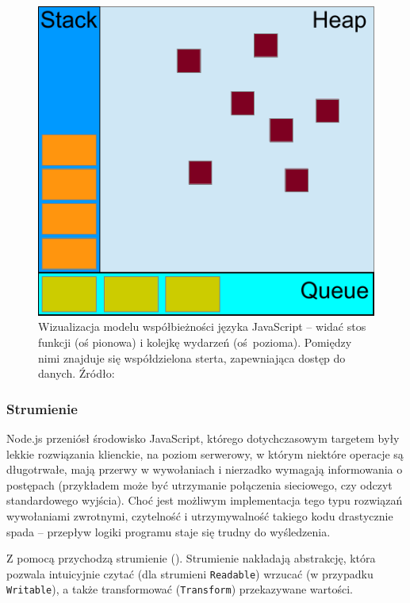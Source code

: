 \begin{figure}[h]

    \centering
    \includegraphics[scale=0.6]{js-concurrency.pdf}

	\caption{Wizualizacja modelu współbieżności języka JavaScript -- widać stos funkcji (oś pionowa) i kolejkę wydarzeń (oś pozioma). Pomiędzy nimi znajduje się współdzielona sterta, zapewniająca dostęp do danych. Źródło: \cite{eventLoop}}

\end{figure}

\subsubsection{Strumienie}

Node.js przeniósł środowisko JavaScript, którego dotychczasowym targetem były lekkie rozwiązania klienckie, na poziom serwerowy, w którym niektóre operacje są długotrwałe, mają przerwy w wywołaniach i nierzadko wymagają informowania o postępach (przykładem może być utrzymanie połączenia sieciowego, czy odczyt standardowego wyjścia). Choć jest możliwym implementacja tego typu rozwiązań  wywołaniami zwrotnymi, czytelność i utrzymywalność takiego kodu drastycznie spada -- przepływ logiki programu staje się trudny do wyśledzenia.

Z pomocą przychodzą strumienie (\cite{nodeStreamAPI}). Strumienie nakładają abstrakcję, która pozwala intuicyjnie czytać (dla strumieni \texttt{Readable}) wrzucać (w przypadku \texttt{Writable}), a także transformować (\texttt{Transform}) przekazywane wartości.

